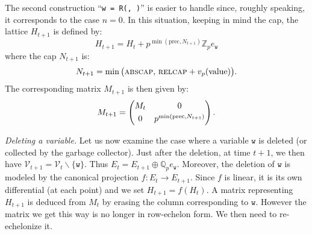 \documentclass[sigconf]{acmart}
\newcommand{\Z}{\mathbb Z}
\newcommand{\Zp}{\Z_p}
\newcommand{\Q}{\mathbb Q}
\newcommand{\Qp}{\Q_p}
\newcommand{\calV}{\mathcal{V}}
\newcommand{\ttw}{\texttt{w}\xspace}
\theoremstyle{definition}
\begin{document}
\smallskip

The second construction
``\verb?w = ?\verb?R(?\verb?, ?\verb?)?''
is easier to handle since, roughly speaking, it corresponds to the
case $n = 0$.
In this situation, keeping in mind the cap, the lattice $H_{t+1}$ is 
defined by:
$$H_{t+1} = H_t + p^{\min(\text{prec}, N_{t+1})} \Zp e_\ttw$$
where the cap $N_{t+1}$ is:
$$N_{t+1} = \min\big(\textsc{abscap},\, \textsc{relcap} + 
v_p(\text{value})\big).$$
The corresponding matrix $M_{t+1}$ is then given by:
$$M_{t+1} = \left(\begin{matrix}
M_t & 0 \smallskip \\ 0 & p^{\min(\text{prec}, N_{t+1})}
\end{matrix}\right).$$

\medskip

\noindent \textit{Deleting a variable.}
%
Let us now examine the case where a variable $\ttw$ is deleted (or 
collected by the garbage collector). Just after the deletion, at
time $t{+}1$, we then have $\calV_{t+1} = \calV_t \backslash \{\ttw\}$.
Thus $E_t = E_{t+1} \oplus \Qp e_\ttw$. Moreover, the deletion of $\ttw$
is modeled by the canonical projection $f : E_t \to E_{t+1}$. Since $f$
is linear, it is its own differential (at each point) and we set 
$H_{t+1} = f(H_t)$.
A matrix representing $H_{t+1}$ is deduced from $M_t$ by erasing the 
column corresponding to $\ttw$. However the matrix we get this way is 
no longer in row-echelon form. We then need to re-echelonize it.

\smallskip
\end{document}
